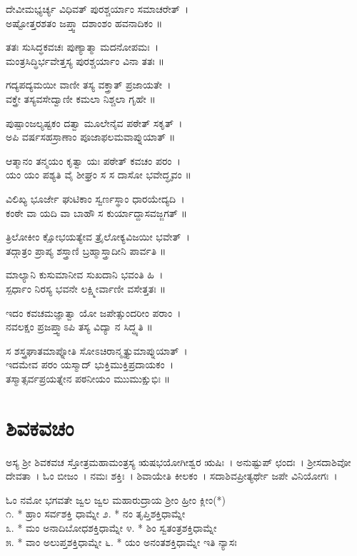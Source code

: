 ದೇವೀಮಭ್ಯರ್ಚ್ಯ ವಿಧಿವತ್ ಪುರಶ್ಚರ್ಯಾಂ ಸಮಾಚರೇತ್~।\\
ಅಷ್ಟೋತ್ತರಶತಂ ಜಪ್ತ್ವಾ ದಶಾಂಶಂ ಹವನಾದಿಕಂ ॥

ತತಃ ಸುಸಿದ್ಧಕವಚಃ ಪುಣ್ಯಾತ್ಮಾ ಮದನೋಪಮಃ~।\\
ಮಂತ್ರಸಿದ್ಧಿರ್ಭವೇತ್ತಸ್ಯ ಪುರಶ್ಚರ್ಯಾಂ ವಿನಾ ತತಃ ॥

ಗದ್ಯಪದ್ಯಮಯೀ ವಾಣೀ ತಸ್ಯ ವಕ್ತ್ರಾತ್ ಪ್ರಜಾಯತೇ~।\\
ವಕ್ತ್ರೇ ತಸ್ಯವಸೇದ್ವಾಣೀ ಕಮಲಾ ನಿಶ್ಚಲಾ ಗೃಹೇ ॥

ಪುಷ್ಪಾಂಜಲ್ಯಷ್ಟಕಂ ದತ್ವಾ ಮೂಲೇನೈವ ಪಠೇತ್ ಸಕೃತ್~।\\
ಅಪಿ ವರ್ಷಸಹಸ್ರಾಣಾಂ ಪೂಜಾಫಲಮವಾಪ್ನುಯಾತ್ ॥

ಆತ್ಮಾನಂ ತನ್ಮಯಂ ಕೃತ್ವಾ ಯಃ ಪಠೇತ್ ಕವಚಂ ಪರಂ~।\\
ಯಂ ಯಂ ಪಶ್ಯತಿ ವೈ ಶೀಘ್ರಂ ಸ ಸ ದಾಸೋ ಭವೇದ್ಧೃವಂ ॥

ವಿಲಿಖ್ಯ ಭೂರ್ಜೇ ಘುಟಿಕಾಂ ಸ್ವರ್ಣಸ್ಥಾಂ ಧಾರಯೇದ್ಯದಿ~।\\
ಕಂಠೇ ವಾ ಯದಿ ವಾ ಬಾಹೌ ಸ ಕುರ್ಯಾದ್ದಾಸವಜ್ಜಗತ್ ॥

ತ್ರಿಲೋಕೀಂ ಕ್ಷೋಭಯತ್ಯೇವ ತ್ರೈಲೋಕ್ಯವಿಜಯೀ ಭವೇತ್~।\\
ತದ್ಗಾತ್ರಂ ಪ್ರಾಪ್ಯ ಶಸ್ತ್ರಾಣಿ ಬ್ರಹ್ಮಾಸ್ತ್ರಾದೀನಿ ಪಾರ್ವತಿ ॥

ಮಾಲ್ಯಾನಿ ಕುಸುಮಾನೀವ ಸುಖದಾನಿ ಭವಂತಿ ಹಿ~।\\
ಸ್ಪರ್ಧಾಂ ನಿರಸ್ಯ ಭವನೇ ಲಕ್ಷ್ಮೀರ್ವಾಣೀ ವಸೇತ್ತತಃ ॥

ಇದಂ ಕವಚಮಜ್ಞಾತ್ವಾ ಯೋ ಜಪೇತ್ಸುಂದರೀಂ ಪರಾಂ~।\\
ನವಲಕ್ಷಂ ಪ್ರಜಪ್ತ್ವಾಽಪಿ ತಸ್ಯ ವಿದ್ಯಾ ನ ಸಿದ್ಧ್ಯತಿ ॥

ಸ ಶಸ್ತ್ರಘಾತಮಾಪ್ನೋತಿ ಸೋಽಚಿರಾನ್ಮೃತ್ಯುಮಾಪ್ನುಯಾತ್~।\\
ಇದಮೇವ ಪರಂ ಯಸ್ಮಾದ್ ಭುಕ್ತಿಮುಕ್ತಿಪ್ರದಾಯಕಂ~।\\
ತಸ್ಮಾತ್ಸರ್ವಪ್ರಯತ್ನೇನ ಪಠನೀಯಂ ಮುುಮುಕ್ಷುಭಿಃ ॥
\section{ಶಿವಕವಚಂ }
ಅಸ್ಯ ಶ್ರೀ ಶಿವಕವಚ ಸ್ತೋತ್ರಮಹಾಮಂತ್ರಸ್ಯ ಋಷಭಯೋಗೀಶ್ವರ ಋಷಿಃ~। ಅನುಷ್ಟುಪ್ ಛಂದಃ~। ಶ್ರೀಸದಾಶಿವೋ ದೇವತಾ~। ಓಂ ಬೀಜಂ~। ನಮಃ ಶಕ್ತಿಃ~। ಶಿವಾಯೇತಿ ಕೀಲಕಂ~। ಸದಾಶಿವಪ್ರೀತ್ಯರ್ಥೇ ಜಪೇ ವಿನಿಯೋಗಃ~।

ಓಂ ನಮೋ ಭಗವತೇ ಜ್ವಲ ಜ್ವಲ ಮಹಾರುದ್ರಾಯ ಶ್ರೀಂ ಹ್ರೀಂ ಕ್ಲೀಂ(*)\\೧. * ಹ್ರಾಂ ಸರ್ವಶಕ್ತಿ ಧಾಮ್ನೇ
೨. * ನಂ ತೃಪ್ತಿಶಕ್ತಿಧಾಮ್ನೇ\\
೩. * ಮಂ ಅನಾದಿಬೋಧಶಕ್ತಿಧಾಮ್ನೇ
೪. * ಶಿಂ ಸ್ವತಂತ್ರಶಕ್ತಿಧಾಮ್ನೇ\\
೫. * ವಾಂ ಅಲುಪ್ತಶಕ್ತಿಧಾಮ್ನೇ
೬. * ಯಂ ಅನಂತಶಕ್ತಿಧಾಮ್ನೇ ಇತಿ ನ್ಯಾಸಃ

